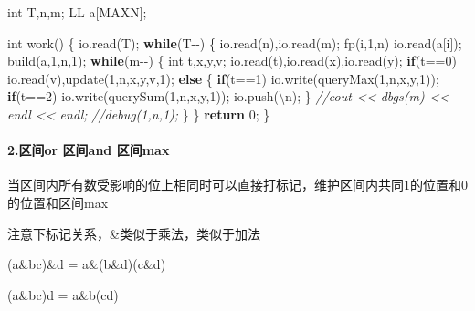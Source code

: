 \documentclass[
]{article}
\newenvironment{Shaded}{}{}
\newcommand{\CharTok}[1]{\textcolor[rgb]{0.25,0.44,0.63}{#1}}
\newcommand{\CommentTok}[1]{\textcolor[rgb]{0.38,0.63,0.69}{\textit{#1}}}
\newcommand{\ControlFlowTok}[1]{\textcolor[rgb]{0.00,0.44,0.13}{\textbf{#1}}}
\newcommand{\DataTypeTok}[1]{\textcolor[rgb]{0.56,0.13,0.00}{#1}}
\newcommand{\DecValTok}[1]{\textcolor[rgb]{0.25,0.63,0.44}{#1}}
\newcommand{\NormalTok}[1]{#1}
\newcommand{\SpecialCharTok}[1]{\textcolor[rgb]{0.25,0.44,0.63}{#1}}
\begin{document}
\begin{Shaded}
\begin{Highlighting}[]
\DataTypeTok{int}\NormalTok{ T,n,m;}
\NormalTok{LL  a[MAXN];}

\DataTypeTok{int}\NormalTok{ work()}
\NormalTok{\{}
\NormalTok{    io.read(T);}
    \ControlFlowTok{while}\NormalTok{(T{-}{-})}
\NormalTok{    \{}
\NormalTok{        io.read(n),io.read(m);}
\NormalTok{        fp(i,}\DecValTok{1}\NormalTok{,n) io.read(a[i]);}
\NormalTok{        build(a,}\DecValTok{1}\NormalTok{,n,}\DecValTok{1}\NormalTok{);}
        \ControlFlowTok{while}\NormalTok{(m{-}{-})}
\NormalTok{        \{}
            \DataTypeTok{int}\NormalTok{ t,x,y,v;}
\NormalTok{            io.read(t),io.read(x),io.read(y);}
            \ControlFlowTok{if}\NormalTok{(t==}\DecValTok{0}\NormalTok{)}
\NormalTok{                io.read(v),update(}\DecValTok{1}\NormalTok{,n,x,y,v,}\DecValTok{1}\NormalTok{);}
            \ControlFlowTok{else}
\NormalTok{            \{}
                \ControlFlowTok{if}\NormalTok{(t==}\DecValTok{1}\NormalTok{) io.write(queryMax(}\DecValTok{1}\NormalTok{,n,x,y,}\DecValTok{1}\NormalTok{));}
                \ControlFlowTok{if}\NormalTok{(t==}\DecValTok{2}\NormalTok{) io.write(querySum(}\DecValTok{1}\NormalTok{,n,x,y,}\DecValTok{1}\NormalTok{));}
\NormalTok{                io.push(}\CharTok{\textquotesingle{}}\SpecialCharTok{\textbackslash{}n}\CharTok{\textquotesingle{}}\NormalTok{);}
\NormalTok{            \}}
            \CommentTok{//cout \textless{}\textless{} dbgs(m) \textless{}\textless{} endl \textless{}\textless{} endl;}
            \CommentTok{//debug(1,n,1);}
\NormalTok{        \}}
\NormalTok{    \}}
    \ControlFlowTok{return} \DecValTok{0}\NormalTok{;}
\NormalTok{\}}
\end{Highlighting}
\end{Shaded}

\hypertarget{ux533aux95f4or-ux533aux95f4and-ux533aux95f4max}{%
\paragraph{2.区间or 区间and
区间max}\label{ux533aux95f4or-ux533aux95f4and-ux533aux95f4max}}

当区间内所有数受影响的位上相同时可以直接打标记，维护区间内共同1的位置和0的位置和区间max

注意下标记关系，\&类似于乘法，\textbar 类似于加法

(a\&b\textbar c)\&d = a\&(b\&d)\textbar(c\&d)

(a\&b\textbar c)\textbar d = a\&b\textbar(c\textbar d)
\end{document}
